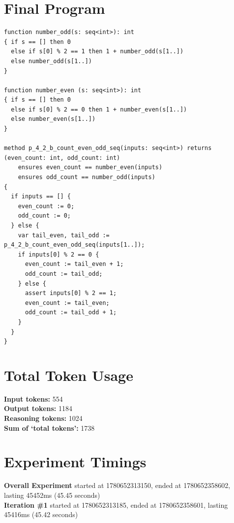 \documentclass{article}
\begin{document}
\section*{Final Program}
\begin{lstlisting}
function number_odd(s: seq<int>): int
{ if s == [] then 0
  else if s[0] % 2 == 1 then 1 + number_odd(s[1..])
  else number_odd(s[1..])
}

function number_even (s: seq<int>): int
{ if s == [] then 0
  else if s[0] % 2 == 0 then 1 + number_even(s[1..])
  else number_even(s[1..])
}

method p_4_2_b_count_even_odd_seq(inputs: seq<int>) returns (even_count: int, odd_count: int)
	ensures even_count == number_even(inputs)
	ensures odd_count == number_odd(inputs)
{
  if inputs == [] {
    even_count := 0;
    odd_count := 0;
  } else {
    var tail_even, tail_odd := p_4_2_b_count_even_odd_seq(inputs[1..]);
    if inputs[0] % 2 == 0 {
      even_count := tail_even + 1;
      odd_count := tail_odd;
    } else {
      assert inputs[0] % 2 == 1;
      even_count := tail_even;
      odd_count := tail_odd + 1;
    }
  }
}
\end{lstlisting}
\section*{Total Token Usage}
\textbf{Input tokens: }554
\\\textbf{Output tokens: }1184
\\\textbf{Reasoning tokens: }1024
\\\textbf{Sum of `total tokens': }1738
\section*{Experiment Timings}
\textbf{Overall Experiment} started at 1780652313150, ended at 1780652358602, lasting 45452ms (45.45 seconds)
\\\textbf{Iteration \#1} started at 1780652313185, ended at 1780652358601, lasting 45416ms (45.42 seconds)
\end{document}
